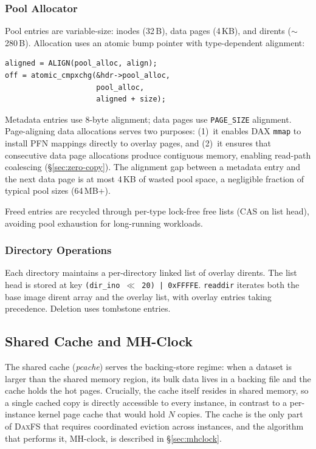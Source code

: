 \documentclass[letterpaper,twocolumn,10pt]{article}
\newcommand{\daxfs}{\textsc{DaxFS}\xspace}
\begin{document}
\subsubsection{Pool Allocator}

Pool entries are variable-size: inodes (32\,B), data pages
(4\,KB), and dirents ($\sim$280\,B).  Allocation uses an
atomic bump pointer with type-dependent alignment:

\begin{lstlisting}
aligned = ALIGN(pool_alloc, align);
off = atomic_cmpxchg(&hdr->pool_alloc,
                     pool_alloc,
                     aligned + size);
\end{lstlisting}

Metadata entries use 8-byte alignment; data pages use \texttt{PAGE\_SIZE}
alignment.  Page-aligning data allocations serves two purposes:
(1)~it enables DAX \texttt{mmap} to install PFN mappings directly to
overlay pages, and (2)~it ensures that consecutive data page allocations
produce contiguous memory, enabling read-path coalescing
(\S\ref{sec:zero-copy}).  The alignment gap between a metadata entry
and the next data page is at most 4\,KB of wasted pool space, a
negligible fraction of typical pool sizes (64\,MB+).

Freed entries are recycled through per-type lock-free free lists (CAS
on list head), avoiding pool exhaustion for long-running workloads.

\subsubsection{Directory Operations}

Each directory maintains a per-directory linked list of overlay
dirents.  The list head is stored at key
\texttt{(dir\_ino $\ll$ 20) | 0xFFFFE}.  \texttt{readdir} iterates
both the base image dirent array and the overlay list, with overlay
entries taking precedence.  Deletion uses tombstone entries.

\subsection{Shared Cache and MH-Clock}
\label{sec:pcache}

The shared cache (\emph{pcache}) serves the backing-store regime: when
a dataset is larger than the shared memory region, its bulk data lives
in a backing file and the cache holds the hot pages.  Crucially, the
cache itself resides in shared memory, so a single cached copy is
directly accessible to every instance, in contrast to a per-instance
kernel page cache that would hold $N$ copies.  The cache is the only
part of \daxfs that requires coordinated eviction across instances, and
the algorithm that performs it, MH-clock, is described in
\S\ref{sec:mhclock}.
\end{document}
